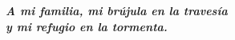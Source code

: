 \begin{dedication}
    \textbf{\textit{A mi familia, mi br\'ujula en la traves\'ia\\ y mi refugio en la tormenta.}}
\end{dedication}